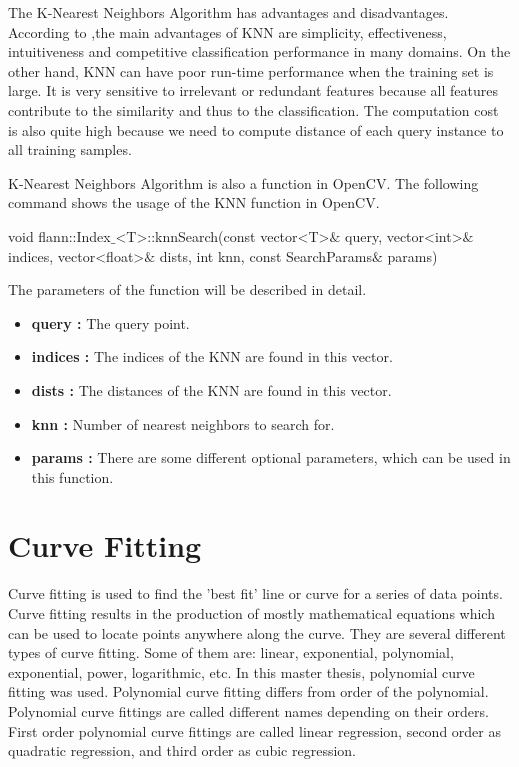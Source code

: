 The K-Nearest Neighbors Algorithm has advantages and disadvantages. According to \cite{k_nearest_neighbors_adv_disadv},the main advantages of KNN are simplicity, effectiveness, intuitiveness and competitive classification performance in many domains. On the other hand, KNN can have poor run-time performance when the training set is large. It is very sensitive to irrelevant or redundant features because all features contribute to the similarity and thus to the classification. The computation cost is also quite high because we need to compute distance of each query instance to all training samples. 

K-Nearest Neighbors Algorithm is also a function in OpenCV. The following command shows the usage of the KNN function in OpenCV.

\begin{center}

void flann::Index$\_$<T>::knnSearch(const vector<T>$\&$ query, vector<int>$\&$ indices, vector<float>$\&$ dists, int knn, const SearchParams$\&$ params)

\end{center}

The parameters of the function will be described in detail.\cite{k_nearest_neighbors_OpenCV}

\begin{itemize}

\item \textbf{query : }The query point.

\item \textbf{indices : }The indices of the KNN are found in this vector.

\item \textbf{dists : }The distances of the KNN are found in this vector.

\item \textbf{knn : }Number of nearest neighbors to search for.

\item \textbf{params : }There are some different optional parameters, which can be used in this function.

\end{itemize}


%
\section{Curve Fitting}\label{sec:Curve Fitting}

Curve fitting is used to find the 'best fit' line or curve for a series of data points. Curve fitting results in the production of mostly mathematical equations which can be used to locate points anywhere along the curve.\cite{Curve_Fitting} They are several different types of curve fitting. Some of them are: linear, exponential, polynomial, exponential, power, logarithmic, etc. In this master thesis, polynomial curve fitting was used. Polynomial curve fitting differs from order of the polynomial. Polynomial curve fittings are called different names depending on their orders. First order polynomial curve fittings are called linear regression, second order as quadratic regression, and third order as cubic regression.


